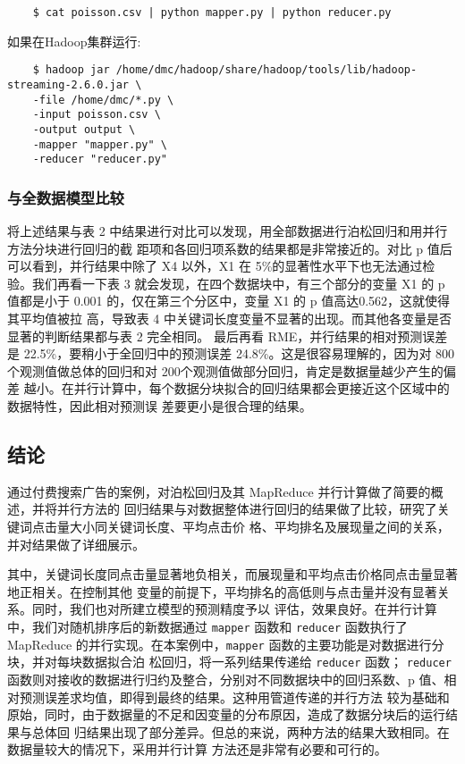 \begin{lstlisting}
	$ cat poisson.csv | python mapper.py | python reducer.py
\end{lstlisting}
如果在Hadoop集群运行:

\begin{lstlisting}
	$ hadoop jar /home/dmc/hadoop/share/hadoop/tools/lib/hadoop-streaming-2.6.0.jar \
	-file /home/dmc/*.py \     
	-input poisson.csv \
	-output output \
	-mapper "mapper.py" \
	-reducer "reducer.py"
\end{lstlisting}


\subsubsection{与全数据模型比较}\label{ux4e0eux5168ux6570ux636eux6a21ux578bux6bd4ux8f83}

将上述结果与表 2
中结果进行对比可以发现，用全部数据进行泊松回归和用并行方法分块进行回归的截
距项和各回归项系数的结果都是非常接近的。对比 p
值后可以看到，并行结果中除了 X4 以外，X1 在
5\%的显著性水平下也无法通过检验。我们再看一下表 3
就会发现，在四个数据块中，有三个部分的变量 X1 的 p 值都是小于 0.001
的，仅在第三个分区中，变量 X1 的 p 值高达0.562，这就使得其平均值被拉
高，导致表 4
中关键词长度变量不显著的出现。而其他各变量是否显著的判断结果都与表 2
完全相同。 最后再看 RME，并行结果的相对预测误差是
22.5\%，要稍小于全回归中的预测误差 24.8\%。这是很容易理解的，因为对 800
个观测值做总体的回归和对
200个观测值做部分回归，肯定是数据量越少产生的偏差
越小。在并行计算中，每个数据分块拟合的回归结果都会更接近这个区域中的数据特性，因此相对预测误
差要更小是很合理的结果。

\subsection{结论}\label{ux7ed3ux8bba}

通过付费搜索广告的案例，对泊松回归及其 MapReduce
并行计算做了简要的概述，并将并行方法的
回归结果与对数据整体进行回归的结果做了比较，研究了关键词点击量大小同关键词长度、平均点击价
格、平均排名及展现量之间的关系，并对结果做了详细展示。

其中，关键词长度同点击量显著地负相关，而展现量和平均点击价格同点击量显著地正相关。在控制其他
变量的前提下，平均排名的高低则与点击量并没有显著关系。同时，我们也对所建立模型的预测精度予以
评估，效果良好。在并行计算中，我们对随机排序后的新数据通过 \lstinline!mapper! 函数和
\lstinline!reducer! 函数执行了 MapReduce 的并行实现。在本案例中，\lstinline!mapper!
函数的主要功能是对数据进行分块，并对每块数据拟合泊
松回归，将一系列结果传递给 \lstinline!reducer! 函数； \lstinline!reducer!
函数则对接收的数据进行归约及整合，分别对不同数据块中的回归系数、p
值、相对预测误差求均值，即得到最终的结果。这种用管道传递的并行方法
较为基础和原始，同时，由于数据量的不足和因变量的分布原因，造成了数据分块后的运行结果与总体回
归结果出现了部分差异。但总的来说，两种方法的结果大致相同。在数据量较大的情况下，采用并行计算
方法还是非常有必要和可行的。


